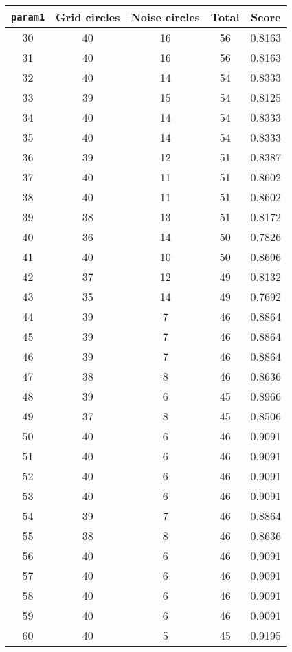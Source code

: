 \documentclass[letterpaper, 12pt]{article}
\begin{document}
\begin{longtable}{|c|c|c|c|c|}
\hline
\textbf{\texttt{param1}} & \textbf{Grid circles} & \textbf{Noise circles} & \textbf{Total} & \textbf{Score} \\
\hline
30 & 40 & 16 & 56 & 0.8163 \\
\hline
31 & 40 & 16 & 56 & 0.8163 \\
\hline
32 & 40 & 14 & 54 & 0.8333 \\
\hline
33 & 39 & 15 & 54 & 0.8125 \\
\hline
34 & 40 & 14 & 54 & 0.8333 \\
\hline
35 & 40 & 14 & 54 & 0.8333 \\
\hline
36 & 39 & 12 & 51 & 0.8387 \\
\hline
37 & 40 & 11 & 51 & 0.8602 \\
\hline
38 & 40 & 11 & 51 & 0.8602 \\
\hline
39 & 38 & 13 & 51 & 0.8172 \\
\hline
40 & 36 & 14 & 50 & 0.7826 \\
\hline
41 & 40 & 10 & 50 & 0.8696 \\
\hline
42 & 37 & 12 & 49 & 0.8132 \\
\hline
43 & 35 & 14 & 49 & 0.7692 \\
\hline
44 & 39 & 7 & 46 & 0.8864 \\
\hline
45 & 39 & 7 & 46 & 0.8864 \\
\hline
46 & 39 & 7 & 46 & 0.8864 \\
\hline
47 & 38 & 8 & 46 & 0.8636 \\
\hline
48 & 39 & 6 & 45 & 0.8966 \\
\hline
49 & 37 & 8 & 45 & 0.8506 \\
\hline
50 & 40 & 6 & 46 & 0.9091 \\
\hline
51 & 40 & 6 & 46 & 0.9091 \\
\hline
52 & 40 & 6 & 46 & 0.9091 \\
\hline
53 & 40 & 6 & 46 & 0.9091 \\
\hline
54 & 39 & 7 & 46 & 0.8864 \\
\hline
55 & 38 & 8 & 46 & 0.8636 \\
\hline
56 & 40 & 6 & 46 & 0.9091 \\
\hline
57 & 40 & 6 & 46 & 0.9091 \\
\hline
58 & 40 & 6 & 46 & 0.9091 \\
\hline
59 & 40 & 6 & 46 & 0.9091 \\
\hline
60 & 40 & 5 & 45 & 0.9195 \\
\hline

\end{longtable}
\end{document}
